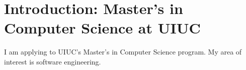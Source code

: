 \section*{Introduction: Master’s in Computer Science at UIUC}
I am applying to UIUC’s Master’s in Computer Science program. 
My area of interest is software engineering.
